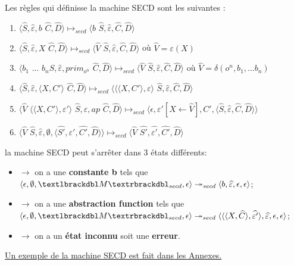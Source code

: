 \documentclass[10pt,a4paper]{article}
\begin{document}
			
				Les règles qui définisse la machine SECD sont les suivantes :
				\begin{enumerate}
					\item $\langle\widehat{S},\widehat{\varepsilon},b$ $\widehat{C},\widehat{D}\rangle \longmapsto_{secd} \langle b$ $\widehat{S},\widehat{\varepsilon},\widehat{C},\widehat{D}\rangle$
					\item $\langle\widehat{S},\widehat{\varepsilon},X$ $\widehat{C},\widehat{D}\rangle \longmapsto_{secd} \langle \widehat{V}$ $\widehat{S},\widehat{\varepsilon},\widehat{C},\widehat{D}\rangle$ où $\widehat{V} = \varepsilon(X)$
					\item $\langle b_{1}$ $...$ $b_{n}\widehat{S},\widehat{\varepsilon},prim_{o^{n}}$ $\widehat{C},\widehat{D}\rangle \longmapsto_{secd} \langle \widehat{V}$ $\widehat{S},\widehat{\varepsilon},\widehat{C},\widehat{D}\rangle$ où $\widehat{V} = \delta(o^{n},b_1,...b_{n})$
					\item $\langle\widehat{S},\widehat{\varepsilon},\langle X,C'\rangle$ $\widehat{C},\widehat{D}\rangle \longmapsto_{secd} \langle\langle\langle X,C'\rangle,\varepsilon\rangle$ $\widehat{S},\widehat{\varepsilon},\widehat{C},\widehat{D}\rangle$
					\item $\langle\widehat{V}$ $\langle\langle X,C'\rangle,\varepsilon'\rangle$ $\widehat{S},\widehat{\varepsilon},ap$ $\widehat{C},\widehat{D}\rangle \longmapsto_{secd} \langle\epsilon,\varepsilon'[X \leftarrow \widehat{V}],C',\langle\widehat{S},\widehat{\varepsilon},\widehat{C},\widehat{D}\rangle\rangle$
					\item $\langle\widehat{V}$ $\widehat{S},\widehat{\varepsilon},\emptyset,\langle\widehat{S'},\widehat{\varepsilon'},\widehat{C'},\widehat{D}\rangle\rangle \longmapsto_{secd} \langle \widehat{V}$ $\widehat{S'},\widehat{\varepsilon'},\widehat{C'},\widehat{D}\rangle$
				\end{enumerate}
				\bigbreak
				
				
				la machine SECD peut s'arrêter dans 3 états différents:
				\begin{itemize}
					\item[]$\longrightarrow$ on a une \textbf{constante b} tels que $\langle \epsilon,\emptyset,\textlbrackdbl M\textrbrackdbl_{secd},\epsilon\rangle \twoheadrightarrow_{secd} \langle b,\widehat{\varepsilon},\epsilon,\epsilon\rangle$;
					\item[]$\longrightarrow$ on a une \textbf{abstraction function} tels que $\langle \epsilon,\emptyset,\textlbrackdbl M\textrbrackdbl_{secd},\epsilon\rangle \twoheadrightarrow_{secd} \langle\langle\langle X,\widehat{C}\rangle,\widehat{\varepsilon'}\rangle,\widehat{\varepsilon},\epsilon,\epsilon\rangle$;
					\item[]$\longrightarrow$ on a un \textbf{état inconnu} soit une \textbf{erreur}.
				\end{itemize}
				\hyperref[SECD]{Un exemple de la machine SECD est fait dans les Annexes.}
				\bigbreak
				
\end{document}
